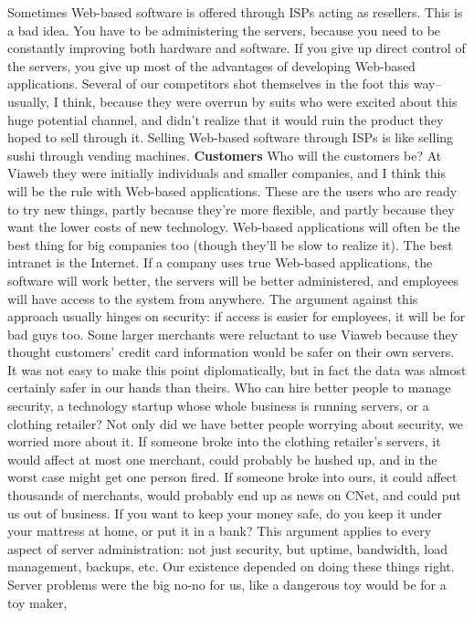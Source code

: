Sometimes Web-based software is offered through ISPs acting as
resellers.  This is a bad idea.  You have to be administering the
servers, because you need to be constantly improving both hardware
and software.  If you give up direct control of the servers, you
give up most of the advantages of developing Web-based applications.
Several of our competitors shot themselves in the foot this way--
usually, I think, because they were overrun by suits who were
excited about this huge potential channel, and didn't realize that
it would ruin the product they hoped to sell through it.  Selling
Web-based software through ISPs is like selling sushi through
vending machines.
\textbf{Customers}
Who will the customers be?  At Viaweb they were initially individuals
and smaller companies, and I think this will be the rule with
Web-based applications.  These are the users who are ready to try
new things, partly because they're more flexible, and partly because
they want the lower costs of new technology.
Web-based applications will often be the best thing for big companies
too (though they'll be slow to realize it).  The best intranet is
the Internet.  If a company uses true Web-based applications, the
software will work better, the servers will be better administered,
and employees will have access to the system from anywhere.
The argument against this approach usually hinges on security: if
access is easier for employees, it will be for bad guys too.  Some
larger merchants were reluctant to use Viaweb because they thought
customers' credit card information would be safer on their own
servers.  It was not easy to make this point diplomatically, but
in fact the data was almost certainly safer in our hands than
theirs.  Who can hire better people to manage security, a technology
startup whose whole business is running servers, or a clothing
retailer?  Not only did we have better people worrying about
security, we worried more about it.  If someone broke into the
clothing retailer's servers, it would affect at most one merchant,
could probably be hushed up, and in the worst case might get one
person fired.  If someone broke into ours, it could affect thousands
of merchants, would probably end up as news on CNet, and could put
us out of business.
If you want to keep your money safe, do you keep it under your
mattress at home, or put it in a bank? This argument applies to
every aspect of server administration:  not just security, but
uptime, bandwidth, load management, backups, etc.  Our existence
depended on doing these things right.  Server problems were the
big no-no for us, like a dangerous toy would be for a toy maker,
